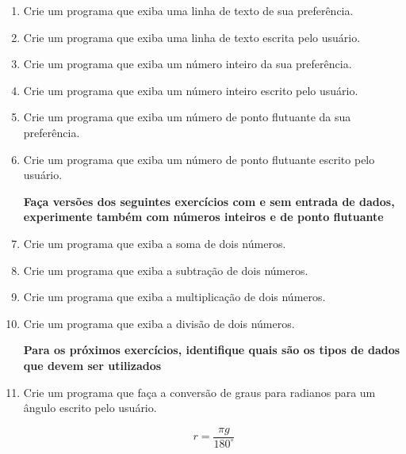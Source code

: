 \begin{enumerate}
	\modo{}{\color{white}}

	\item Crie um programa que exiba 
	uma linha de texto 
	de sua preferência.
	
	\item Crie um programa que exiba 
	uma linha de texto 
	escrita pelo usuário.



	\item Crie um programa que exiba 
	um número 
	inteiro 
	da sua preferência.
	
	\item Crie um programa que exiba 
	um número 
	inteiro 
	escrito pelo usuário.


	\item Crie um programa que exiba 
	um número 
	de ponto flutuante 
	da sua preferência.
	
	\item Crie um programa que exiba 
	um número 
	de ponto flutuante 
	escrito pelo usuário.



\quebra
	
\textbf{Faça versões dos seguintes exercícios com e sem entrada de dados, experimente também com números inteiros e de ponto flutuante}		
	
	\item Crie um programa que exiba 
	a soma 
	de dois números.
	
	\item Crie um programa que exiba 
	a subtração 
	de dois números.
	
	\item Crie um programa que exiba 
	a multiplicação 
	de dois números.
	
	\item Crie um programa que exiba 
	a divisão  
	de dois números.


\quebra
\textbf{Para os próximos exercícios, identifique quais são os tipos de dados que devem ser utilizados}

	\item Crie um programa que faça 
	a conversão de 
	graus para radianos 
	para um ângulo 
	escrito pelo usuário.
	
		\begin{equation*}
			r = \frac{\pi g}{180^\circ} 			
		\end{equation*}
		

\end{enumerate}
